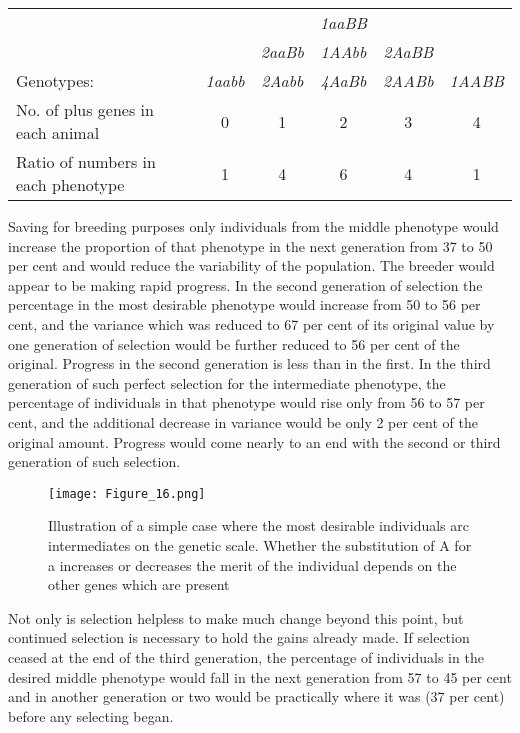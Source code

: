 \begin{table}[htbp]
	\centering
	\begin{tabular}{L{3cm}ccccc}
	 	&		&					& \textit{1aaBB}	&					&	\\
	 	&		& \textit{2aaBb}	& \textit{1AAbb}	& \textit{2AaBB}	&	\\
	Genotypes:	& \textit{1aabb}	& \textit{2Aabb}	& \textit{4AaBb}	& \textit{2AABb}	& \textit{1AABB} \\
	\hline
	No. of plus genes in each animal	& 0					& 1					& 2					& 3					& 4 \\
	Ratio of numbers in each phenotype	& 1					& 4					& 6					& 4					& 1 \\
	\end{tabular}
\end{table}

\noindent
Saving for breeding purposes only individuals from the middle phenotype
would increase the proportion of that phenotype in the next generation
from 37 to 50 per cent and would reduce the variability of the
population. The breeder would appear to be making rapid progress.
In the second generation of selection the percentage in the most desirable
phenotype would increase from 50 to 56 per cent, and the variance
which was reduced to 67 per cent of its original value by one generation
of selection would be further reduced to 56 per cent of the original.
Progress in the second generation is less than in the first. In the third
generation of such perfect selection for the intermediate phenotype, the
percentage of individuals in that phenotype would rise only from 56 to
57 per cent, and the additional decrease in variance would be only 2 per
cent of the original amount. Progress would come nearly to an end with
the second or third generation of such selection.

\begin{figure}
	\centering
    \texttt{[image: Figure\_16.png]}
    \caption{Illustration of a simple case where the most desirable individuals arc
			 intermediates on the genetic scale. Whether the substitution of A for a increases or
			 decreases the merit of the individual depends on the other genes which are present}
    \label{fig:Lush_Figure_16}
\end{figure}

Not only is selection helpless to make much change beyond this
point, but continued selection is necessary to hold the gains already
made. If selection ceased at the end of the third generation, the percentage
of individuals in the desired middle phenotype would fall in
the next generation from 57 to 45 per cent and in another generation or
two would be practically where it was (37 per cent) before any selecting
began.

